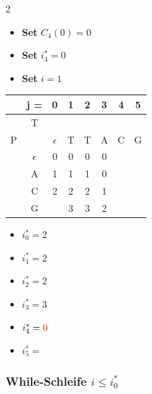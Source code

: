 \begin{multicols}{2}

    \begin{itemize}
        \item \textbf{Set} $C_4(0) = 0$
        \item \textbf{Set} $i_4^\ast = 0$
        \item \textbf{Set} $i = 1$
    \end{itemize}
    \begin{center}
        \begin{tabular}{|c c|c|c|c|c|c|c|} \hline
        &   j =     &  0            &   1   &   2   &   3   &   4   &   5   \\ \hline
        &   T       &               &       &       &       &       &       \\
        P   &       &  $\epsilon$   &   T   &   T   &   A   &   C   &   G   \\ \hline
        & $\epsilon$&       0       &0      &  0    & 0     &   \ccr0    &       \\ \hline
        &    A      &       1       &   1   &  1    & 0     &       &       \\ \hline
        &    C      &   2           &   2   &   2   &  1    &       &       \\ \hline
        &    G      &               &3      &  3    & 2     &       &       \\ \hline
        \end{tabular}
    \end{center}
    \columnbreak
    \begin{itemize}
        \item $i_0^\ast = 2$
        \item $i_1^\ast = 2 $
        \item $i_2^\ast = 2$
        \item $i_3^\ast = 3$
        \item $i_4^\ast = \textcolor{red}{0}  $
        \item $i_5^\ast = $
    \end{itemize}
\end{multicols}

\subsubsection*{While-Schleife $i \le i_{0}^\ast$}


